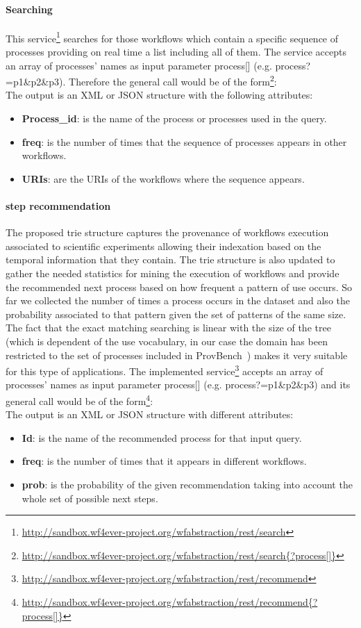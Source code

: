 \paragraph{Searching}
This service\footnote{\url{http://sandbox.wf4ever-project.org/wfabstraction/rest/search}} searches for those workflows which contain a specific sequence of processes providing on real time a list including all of them. The service accepts an array of processes' names as input parameter process[] (e.g. process?=p1\&p2\&p3). Therefore the general call would be of the form\footnote{\url{http://sandbox.wf4ever-project.org/wfabstraction/rest/search{?process[]}}}:\\

The output is an XML or JSON structure with the following attributes: 
\begin{itemize}
\item \textbf{Process\_id}: is the name of the process or processes used in the query.
\item \textbf{freq}: is the number of times that the sequence of processes appears in other workflows.
\item \textbf{URIs}: are the URIs of the workflows where the sequence appears. 
\end{itemize}

\paragraph{step recommendation}
The proposed trie structure captures the provenance of workflows execution associated to scientific experiments allowing
their indexation based on the temporal information that they contain. The trie structure is also updated to gather
the needed statistics for mining the execution of workflows and provide the recommended next process based on how frequent 
a pattern of use occurs. So far we collected the number of times a process occurs in the dataset and also the probability associated 
to that pattern given the set of patterns of the same size. The fact that the exact matching searching is linear with the size of the tree (which is dependent of the use vocabulary, in our case the domain has been restricted to the set of processes included in ProvBench~\cite{khalid_13}) makes it very suitable for 
this type of applications. The implemented service\footnote{\url{http://sandbox.wf4ever-project.org/wfabstraction/rest/recommend}} accepts an array of processes' names as input parameter process[] (e.g. process?=p1\&p2\&p3) and its general call would be of the form\footnote{\url{http://sandbox.wf4ever-project.org/wfabstraction/rest/recommend{?process[]}}}: \\

The output is an XML or JSON structure with different attributes:
\begin{itemize}
\item \textbf{Id}: is the name of the recommended process for that input query.
\item \textbf{freq}:  is the number of times that it appears in different workflows.
\item \textbf{prob}:  is the probability of the given recommendation taking into account the whole set of possible next steps.
\end{itemize}